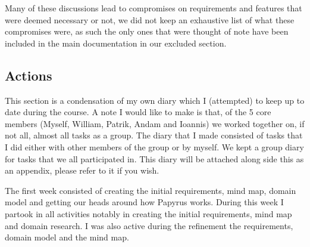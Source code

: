 \documentclass{article}
\begin{document}
 Many of these discussions lead to compromises on requirements and features that were deemed necessary or not, we did not keep an exhaustive list of what these compromises were, as such the only ones that were thought of note have been included in the main documentation in our excluded section.

\subsection*{Actions}

This section is a condensation of my own diary which I (attempted) to keep up to date during the course. A note I would like to make is that, of the 5 core members (Myself, William, Patrik, Andam and Ioannis) we worked together on, if not all, almost all tasks as a group. The diary that I made consisted of tasks that I did either with other members of the group or by myself. We kept a group diary for tasks that we all participated in. This diary will be attached along side this as an appendix, please refer to it if you wish.
\par

The first week consisted of creating the initial requirements, mind map, domain model and getting our heads around how Papyrus works. During this week I partook in all activities notably in creating the initial requirements, mind map and domain research. I was also active during the refinement the requirements, domain model and the mind map.
\par
\end{document}
